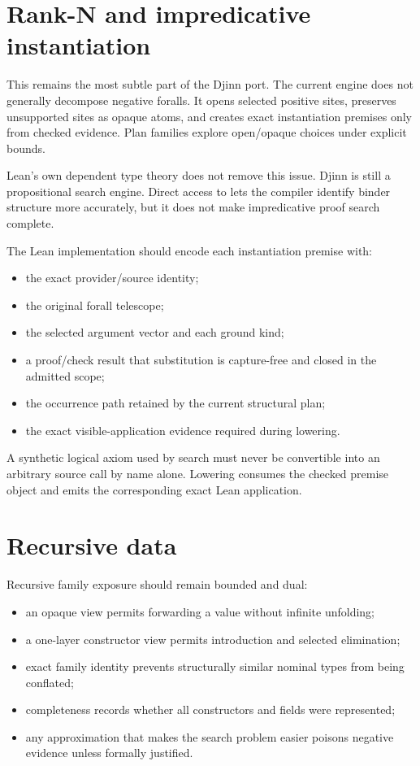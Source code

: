 \documentclass[10pt,letterpaper,oneside]{report}
\newcommand{\code}[1]{\texttt{\detokenize{#1}}}
\begin{document}
\section{Rank-N and impredicative instantiation}

This remains the most subtle part of the Djinn port. The current engine does not generally decompose negative foralls. It opens selected positive sites, preserves unsupported sites as opaque atoms, and creates exact instantiation premises only from checked evidence. Plan families explore open/opaque choices under explicit bounds.

Lean's own dependent type theory does not remove this issue. Djinn is still a propositional search engine. Direct access to \code{Expr} lets the compiler identify binder structure more accurately, but it does not make impredicative proof search complete.

The Lean implementation should encode each instantiation premise with:

\begin{itemize}
  \item the exact provider/source identity;
  \item the original forall telescope;
  \item the selected argument vector and each ground kind;
  \item a proof/check result that substitution is capture-free and closed in the admitted scope;
  \item the occurrence path retained by the current structural plan;
  \item the exact visible-application evidence required during lowering.
\end{itemize}

A synthetic logical axiom used by search must never be convertible into an arbitrary source call by name alone. Lowering consumes the checked premise object and emits the corresponding exact Lean application.

\section{Recursive data}

Recursive family exposure should remain bounded and dual:

\begin{itemize}
  \item an opaque view permits forwarding a value without infinite unfolding;
  \item a one-layer constructor view permits introduction and selected elimination;
  \item exact family identity prevents structurally similar nominal types from being conflated;
  \item completeness records whether all constructors and fields were represented;
  \item any approximation that makes the search problem easier poisons negative evidence unless formally justified.
\end{itemize}
\end{document}
